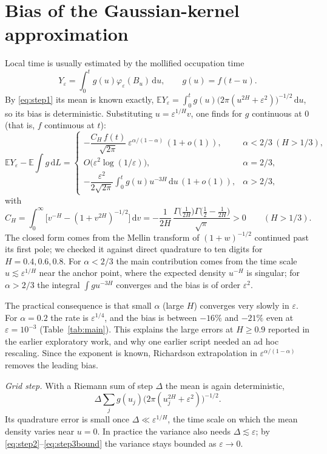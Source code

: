 \documentclass[11pt]{article}
\theoremstyle{remark}
\theoremstyle{definition}
\newcommand{\E}{\mathbb{E}}
\newcommand{\dd}{\,\mathrm{d}}
\begin{document}
\section{Bias of the Gaussian-kernel approximation}\label{sec:bias}
Local time is usually estimated by the mollified occupation time
\[
Y_\varepsilon=\int_0^t g(u)\varphi_\varepsilon(B_u)\dd u,\qquad g(u)=f(t-u).
\]
By \eqref{eq:step1} its mean is known exactly, $\E Y_\varepsilon=\int_0^t g(u)\big(2\pi(u^{2H}+\varepsilon^2)\big)^{-1/2}\dd u$, so its bias is deterministic. Substituting $u=\varepsilon^{1/H}v$, one finds for $g$ continuous at $0$ (that is, $f$ continuous at $t$):
\begin{equation}\label{eq:bias}
\E Y_\varepsilon-\E\!\int g\dd L=
\begin{cases}
-\dfrac{C_H\,f(t)}{\sqrt{2\pi}}\ \varepsilon^{\alpha/(1-\alpha)}\,(1+o(1)), & \alpha<2/3\ (H>1/3),\\[8pt]
O\big(\varepsilon^2\log(1/\varepsilon)\big), & \alpha=2/3,\\[4pt]
-\dfrac{\varepsilon^2}{2\sqrt{2\pi}}\displaystyle\int_0^t g(u)u^{-3H}\dd u\,(1+o(1)), & \alpha>2/3,
\end{cases}
\end{equation}
with
\[
C_H=\int_0^\infty\big[v^{-H}-(1+v^{2H})^{-1/2}\big]\dd v=-\frac{1}{2H}\,\frac{\Gamma\big(\tfrac1{2H}\big)\Gamma\big(\tfrac12-\tfrac1{2H}\big)}{\sqrt\pi}>0\qquad(H>1/3).
\]
The closed form comes from the Mellin transform of $(1+w)^{-1/2}$ continued past its first pole; we checked it against direct quadrature to ten digits for $H=0.4,0.6,0.8$. For $\alpha<2/3$ the main contribution comes from the time scale $u\lesssim\varepsilon^{1/H}$ near the anchor point, where the expected density $u^{-H}$ is singular; for $\alpha>2/3$ the integral $\int g u^{-3H}$ converges and the bias is of order $\varepsilon^2$.

The practical consequence is that small $\alpha$ (large $H$) converges very slowly in $\varepsilon$. For $\alpha=0.2$ the rate is $\varepsilon^{1/4}$, and the bias is between $-16\%$ and $-21\%$ even at $\varepsilon=10^{-3}$ (Table~\ref{tab:main}). This explains the large errors at $H\ge0.9$ reported in the earlier exploratory work, and why one earlier script needed an ad hoc rescaling. Since the exponent is known, Richardson extrapolation in $\varepsilon^{\alpha/(1-\alpha)}$ removes the leading bias.

\emph{Grid step.} With a Riemann sum of step $\Delta$ the mean is again deterministic,
\[\Delta\sum_j g(u_j)\big(2\pi(u_j^{2H}+\varepsilon^2)\big)^{-1/2}.\]
Its quadrature error is small once $\Delta\ll\varepsilon^{1/H}$, the time scale on which the mean density varies near $u=0$. In practice the variance also needs $\Delta\lesssim\varepsilon$; by \eqref{eq:step2}--\eqref{eq:step3bound} the variance stays bounded as $\varepsilon\to0$.
\end{document}
